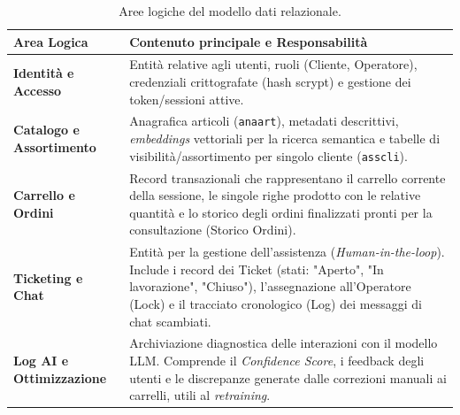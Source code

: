 \documentclass[a4paper, 11pt, oneside]{scrartcl}
\begin{document}
\begin{table}[H]
    \centering
    \renewcommand{\arraystretch}{1.5}
    \begin{tabularx}{\textwidth}{@{}lX@{}}
        \toprule
        \textbf{Area Logica} & \textbf{Contenuto principale e Responsabilità} \\
        \midrule
        \textbf{Identità e Accesso} & Entità relative agli utenti, ruoli (Cliente, Operatore), credenziali crittografate (hash scrypt) e gestione dei token/sessioni attive. \\
        \textbf{Catalogo e Assortimento} & Anagrafica articoli (\texttt{anaart}), metadati descrittivi, \textit{embeddings} vettoriali per la ricerca semantica e tabelle di visibilità/assortimento per singolo cliente (\texttt{asscli}). \\
        \textbf{Carrello e Ordini} & Record transazionali che rappresentano il carrello corrente della sessione, le singole righe prodotto con le relative quantità e lo storico degli ordini finalizzati pronti per la consultazione (Storico Ordini). \\
        \textbf{Ticketing e Chat} & Entità per la gestione dell'assistenza (\textit{Human-in-the-loop}). Include i record dei Ticket (stati: "Aperto", "In lavorazione", "Chiuso"), l'assegnazione all'Operatore (Lock) e il tracciato cronologico (Log) dei messaggi di chat scambiati. \\
        \textbf{Log AI e Ottimizzazione} & Archiviazione diagnostica delle interazioni con il modello LLM. Comprende il \textit{Confidence Score}, i feedback degli utenti e le discrepanze generate dalle correzioni manuali ai carrelli, utili al \textit{retraining}. \\
        \bottomrule
    \end{tabularx}
    \caption{Aree logiche del modello dati relazionale.}
\end{table}
\end{document}
